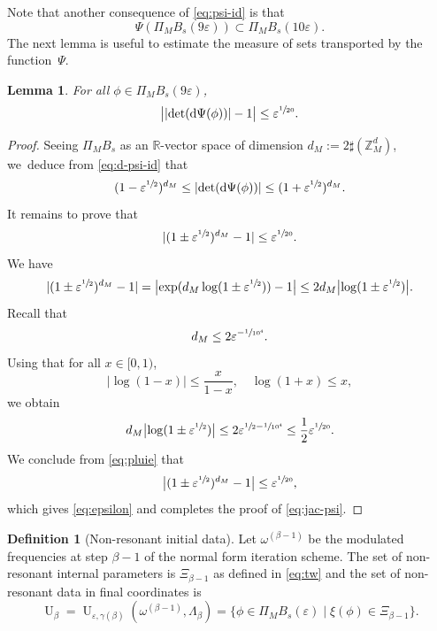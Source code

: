 \documentclass[JEP,XML,SOM,Unicode,published]{cedram}
\theoremstyle{plain}
\newtheorem{lemma}[theorem]{Lemma}
\theoremstyle{definition}
\newtheorem{definition}[theorem]{Definition}
\newcommand{\Z}{\mathbb{Z}}
\newcommand{\R}{\mathbb{R}}
\newcommand{\1}{\mathbf{1}}
\let\epsilon\varepsilon
\begin{document}
Note that another consequence of \eqref{eq:psi-id} is that
\[
\Psi(\Pi_{M}B_{s}(9\epsilon)) \subset \Pi_{M}B_{s}(10\epsilon).
\]
The next lemma is useful to estimate the measure of sets transported by the function~$\Psi$.
\begin{lemma}
\label{lem:meas-psi}
For all $\phi\in\Pi_{M}B_{s}(9\epsilon)$,
\begin{equation}
\label{eq:jac-psi}
\big|
|{\det(\mathrm{d}\Psi(\phi))}|-1
\big|
\leq
\epsilon^{\sfrac{1}{20}}.
\end{equation}
\end{lemma}
\begin{proof}
Seeing $\Pi_{M}B_{s}$ as an $\R$-vector space of dimension $d_{M}:=2\sharp(\Z_{M}^{d})$, we~deduce from \eqref{eq:d-psi-id} that
\[
(1-\epsilon^{\sfrac{1}{2}})^{d_{M}}\leq|{\det(\mathrm{d}\Psi(\phi))}| \leq (1+\epsilon^{\sfrac{1}{2}})^{d_{M}}.
\]
It remains to prove that
\begin{equation}
\label{eq:epsilon}
|(1\pm\epsilon^{\sfrac{1}{2}})^{d_{M}}-1| \leq \epsilon^{\sfrac{1}{20}}.
\end{equation}
We have
\begin{equation}
\label{eq:pluie}
|(1\pm\epsilon^{\sfrac{1}{2}})^{d_{M}}-1|
= \bigl|\exp(d_{M}\log(1\pm\epsilon^{\sfrac{1}{2}}))-1\bigr| \leq 2d_{M}\bigl|\log(1\pm\epsilon^{\sfrac{1}{2}})\bigr|.
\end{equation}
Recall that
\[
d_{M} \leq 2\epsilon^{-\sfrac{1}{10^{4}}}.
\]
Using that for all $x\in[0,1)$,
\[
\bigl|\log(1-x)\bigr|\leq \frac{x}{1-x},\quad \log(1+x)\leq x,
\]
we obtain
\[
d_{M}\bigl|\log(1\pm\epsilon^{\sfrac{1}{2}})\bigr|\leq 2\epsilon^{\sfrac{1}{2}-\sfrac{1}{10^{4}}} \leq \frac{1}{2}\epsilon^{\sfrac{1}{20}}.
\]
We conclude from \eqref{eq:pluie} that
\[
\bigl|(1\pm\epsilon^{\sfrac{1}{2}})^{d_{M}}-1\bigr| \leq \epsilon^{\sfrac{1}{20}},
\]
which gives \eqref{eq:epsilon} and completes the proof of \eqref{eq:jac-psi}.
\end{proof}
\begin{definition}[Non-resonant initial data]
\label{def:u-frak}
Let $\omega^{(\beta-1)}$ be the modulated frequencies at step $\beta-1$ of the normal form iteration scheme. The set of non-resonant internal parameters is $\Xi_{\beta-1}$ as defined in \eqref{eq:tw} and the set of non-resonant data in final coordinates is
\begin{equation}
\label{eq:U}
\operatorname{U}_{\beta}
= \operatorname{U}_{\epsilon,\gamma(\beta)}(\omega^{(\beta-1)},\Lambda_{\beta})
= \big\{\phi\in\Pi_{M}B_{s}(\epsilon)\mid \xi(\phi)\in\Xi_{\beta-1}\big\}.
\end{equation}
\end{definition}
\end{document}

